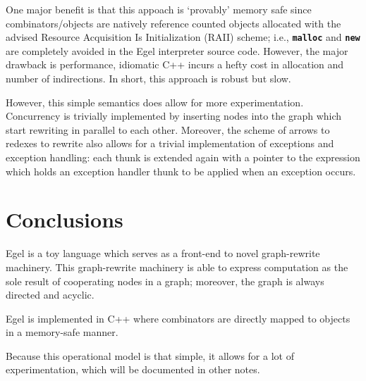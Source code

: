 \documentclass{research4cacm}
\newcommand{\code}[1]{{\bf\texttt{#1}}}
\begin{document}
One major benefit is that this appoach is `provably'
memory safe since combinators/objects are natively
reference counted objects allocated with the advised
Resource Acquisition Is Initialization (RAII) scheme; i.e.,
\code{malloc} and \code{new} are 
completely avoided in the Egel interpreter source
code. However, the major drawback is
performance, idiomatic C++ incurs a hefty cost in
allocation and number of indirections. In short,
this approach is robust but slow.

However, this simple semantics does allow for
more experimentation. Concurrency is trivially
implemented by inserting nodes into the graph
which start rewriting in parallel to each other.
Moreover, the scheme of arrows
to redexes to rewrite also allows for a
trivial implementation of exceptions and 
exception handling: each thunk is extended
again with a pointer to the expression which
holds an exception handler thunk to be applied
when an exception occurs.

\section{Conclusions}

Egel is a toy language which serves as a front-end
to novel graph-rewrite machinery. This graph-rewrite
machinery is able to express computation as the 
sole result of cooperating nodes in a graph; moreover,
the graph is always directed and acyclic.

Egel is implemented in C++ where combinators
are directly mapped to objects in a memory-safe
manner.

Because this operational model is that simple, it
allows for a lot of experimentation, which will
be documented in other notes.



\balancecolumns
\end{document}
